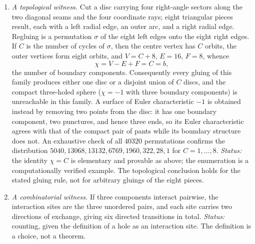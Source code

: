 \begin{enumerate}
  \item \emph{A topological witness.}  Cut a disc carrying four right-angle
  sectors along the two diagonal seams and the four coordinate rays; eight
  triangular pieces result, each with a left radial edge, an outer arc, and a
  right radial edge.  Regluing is a permutation $\sigma$ of the eight left edges
  onto the eight right edges.  If $C$ is the number of cycles of $\sigma$, then
  the centre vertex has $C$ orbits, the outer vertices form eight orbits, and
  $V=C+8$, $E=16$, $F=8$, whence
  \[
    \chi=V-E+F=C=b ,
  \]
  the number of boundary components.  Consequently every gluing of this family
  produces either one disc or a disjoint union of $C$ discs, and the compact
  three-holed sphere ($\chi=-1$ with three boundary components) is unreachable
  in this family.  A surface of Euler characteristic $-1$ is obtained instead by
  removing two points from the disc: it has one boundary component, two
  punctures, and hence three ends, so its Euler characteristic agrees with that
  of the compact pair of pants while its boundary structure does not.  An
  exhaustive check of all $40320$ permutations confirms the
  distribution $5040,13068,13132,6769,1960,322,28,1$ for $C=1,\ldots,8$.
  \emph{Status:} the identity $\chi=C$ is elementary and provable as above; the
  enumeration is a computationally verified example.  The topological
  conclusion holds for the stated gluing rule, not for arbitrary gluings of the
  eight pieces.

  \item \emph{A combinatorial witness.}  If three components interact pairwise,
  the interaction sites are the three unordered pairs, and each site carries two
  directions of exchange, giving six directed transitions in total.
  \emph{Status:} counting, given the definition of a hole as an interaction
  site.  The definition is a choice, not a theorem.


\end{enumerate}
